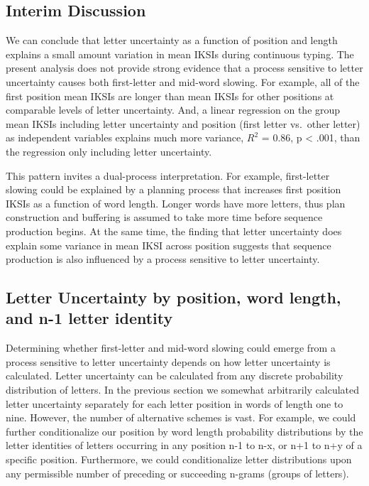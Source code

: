 \documentclass[,man,donotrepeattitle,floatsintext]{apa6}
\begin{document}
\hypertarget{interim-discussion}{%
\subsection{Interim Discussion}\label{interim-discussion}}

We can conclude that letter uncertainty as a function of position and length explains a small amount variation in mean IKSIs during continuous typing. The present analysis does not provide strong evidence that a process sensitive to letter uncertainty causes both first-letter and mid-word slowing. For example, all of the first position mean IKSIs are longer than mean IKSIs for other positions at comparable levels of letter uncertainty. And, a linear regression on the group mean IKSIs including letter uncertainty and position (first letter vs.~other letter) as independent variables explains much more variance, \(R^2\) = 0.86, p \textless{} .001, than the regression only including letter uncertainty.

This pattern invites a dual-process interpretation. For example, first-letter slowing could be explained by a planning process that increases first position IKSIs as a function of word length. Longer words have more letters, thus plan construction and buffering is assumed to take more time before sequence production begins. At the same time, the finding that letter uncertainty does explain some variance in mean IKSI across position suggests that sequence production is also influenced by a process sensitive to letter uncertainty.

\hypertarget{letter-uncertainty-by-position-word-length-and-n-1-letter-identity}{%
\subsection{Letter Uncertainty by position, word length, and n-1 letter identity}\label{letter-uncertainty-by-position-word-length-and-n-1-letter-identity}}

Determining whether first-letter and mid-word slowing could emerge from a process sensitive to letter uncertainty depends on how letter uncertainty is calculated. Letter uncertainty can be calculated from any discrete probability distribution of letters. In the previous section we somewhat arbitrarily calculated letter uncertainty separately for each letter position in words of length one to nine. However, the number of alternative schemes is vast. For example, we could further conditionalize our position by word length probability distributions by the letter identities of letters occurring in any position n-1 to n-x, or n+1 to n+y of a specific position. Furthermore, we could conditionalize letter distributions upon any permissible number of preceding or succeeding n-grams (groups of letters).
\end{document}
